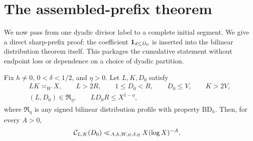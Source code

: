 \section{The assembled-prefix theorem}
\label{sec:assembly}

We now pass from one dyadic divisor label to a complete initial
segment.  We give a direct sharp-prefix proof: the coefficient
$\mathbf 1_{d\le D_0}$ is inserted into the bilinear distribution theorem
itself.  This packages the cumulative statement without endpoint loss
or dependence on a choice of dyadic partition.

\begin{theorem}
\label{thm:assembled-prefix}
Fix $h\ne0$, $0<\delta<1/2$, and $\eta>0$.  Let $L,K,D_0$ satisfy
\begin{align}
 &LK\asymp_W X,
 \qquad L>2R,
 \qquad 1\le D_0<R,
 \qquad D_0\le V,
 \qquad K>2V,
 \label{eq:assembly-geometry}\\
 &(L,D_0)\in\mathfrak R_\eta,
 \qquad LD_0R\le X^{1-\eta},
 \label{eq:assembly-analysis}
\end{align}
where $\mathfrak R_\eta$ is any signed bilinear distribution profile
with property $\mathrm{BD}_h$.  Then, for every $A>0$,
\begin{equation}
 \mathcal C_{L,K}(D_0)
 \ll_{A,h,W,\psi,\delta,\eta}X(\log X)^{-A}.
 \label{eq:assembled-prefix-bound}
\end{equation}
\end{theorem}

